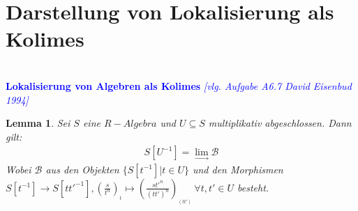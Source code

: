 \documentclass[10pt,a4paper]{report}
\newcommand{\ModulsOfDifferenzials}{David Eisenbud 1994}
\newcounter{Aussage}[chapter]
\newtheorem{lemma}[Aussage]{Lemma}
\newcommand{\lok}[2]{#1 [#2^{-1}]}
\newcommand{\loke}[3]{(\frac{#1}{#2})_{_{#3}}}
\newcommand{\colimes}[0]{\lim\limits_{ \longrightarrow }}
\begin{document}
\section{Darstellung von Lokalisierung als Kolimes}
\ \\
\textcolor{blue}{\textbf{Lokalisierung von Algebren als Kolimes} \textit{[vlg. Aufgabe A6.7 \ModulsOfDifferenzials]}}
\begin{lemma}\label{Lokalisierung von Algebren als Kolimes}
Sei $S$ eine $R-Algebra$ und $U \subseteq S$ multiplikativ abgeschlossen.
Dann gilt:
\begin{gather*}
 S[U^{-1}] = \colimes \mathcal{B}
\end{gather*}
Wobei $\mathcal{B}$ aus den Objekten $\lbrace \lok{S}{t} \vert t \in U \rbrace$ und den Morphismen\\
$\lok{S}{t} \longrightarrow \lok{S}{tt'}, \loke{s}{t^n}{t} \longmapsto \loke{st'^n}{(tt')^n}{(tt')} \,
\forall t,t' \in U$ besteht.\\
\end{lemma}
\end{document}
